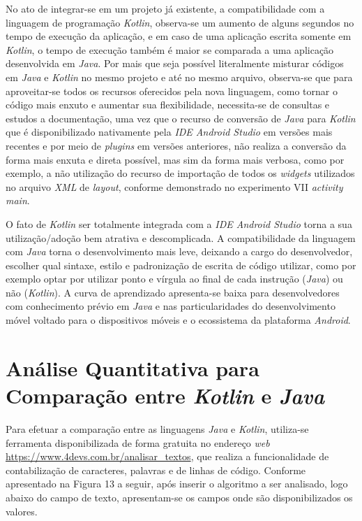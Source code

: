 No ato de integrar-se em um projeto já existente, a compatibilidade com a linguagem de programação \textit{Kotlin}, observa-se um aumento de alguns segundos no tempo de execução da aplicação, e em caso de uma aplicação escrita somente em \textit{Kotlin}, o tempo de execução também é maior se comparada a uma aplicação desenvolvida em \textit{Java}. Por mais que seja possível literalmente misturar códigos em \textit{Java} e \textit{Kotlin} no mesmo projeto e até no mesmo arquivo, observa-se que para aproveitar-se todos os recursos oferecidos pela nova linguagem, como tornar o código mais enxuto e aumentar sua flexibilidade, necessita-se de consultas e estudos a documentação, uma vez que o recurso de conversão de \textit{Java} para \textit{Kotlin} que é disponibilizado nativamente pela \textit{IDE Android Studio} em versões mais recentes e por meio de \textit{plugins} em versões anteriores, não realiza a conversão da forma mais enxuta e direta possível, mas sim da forma mais verbosa, como por exemplo, a não utilização do recurso de importação de todos os \textit{widgets} utilizados no arquivo \textit{XML} de \textit{layout}, conforme demonstrado no experimento VII \textit{activity main}. 

O fato de \textit{Kotlin} ser totalmente integrada com a \textit{IDE Android Studio} torna a sua utilização/adoção bem atrativa e descomplicada. A compatibilidade da linguagem com \textit{Java} torna o desenvolvimento mais leve, deixando a cargo do desenvolvedor, escolher qual sintaxe, estilo e padronização de escrita de código utilizar, como por exemplo optar por utilizar ponto e vírgula ao final de cada instrução (\textit{Java}) ou não (\textit{Kotlin}). A curva de aprendizado apresenta-se baixa para desenvolvedores com conhecimento prévio em \textit{Java} e nas particularidades do desenvolvimento móvel voltado para o dispositivos móveis e o ecossistema da plataforma \textit{Android}.

\section{Análise Quantitativa para Comparação entre \textit{Kotlin} e \textit{Java}}

Para efetuar a comparação entre as linguagens \textit{Java} e \textit{Kotlin}, utiliza-se ferramenta disponibilizada de forma gratuita no endereço \textit{web} \url{https://www.4devs.com.br/analisar_textos}, que realiza a funcionalidade de contabilização de caracteres, palavras e de linhas de código. Conforme apresentado na Figura 13 a seguir, após inserir o algoritmo a ser analisado, logo abaixo do campo de texto, apresentam-se os campos onde são disponibilizados os valores.

